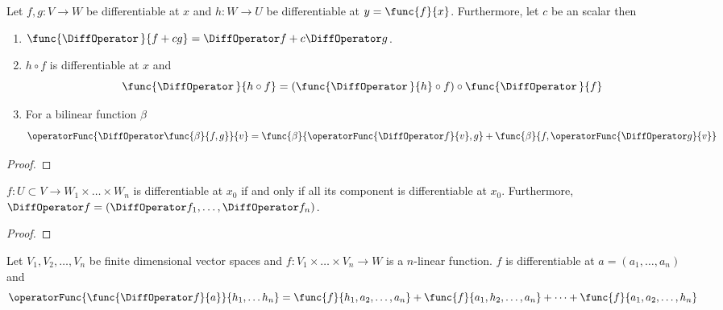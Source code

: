 \begin{proposition}
    Let \(f,g : V \to W\) be differentiable at \(x\) and \(h : W \to U\) be differentiable at \(y = \func{f}{x}\). Furthermore, let \(c\) be an scalar then
    \begin{enumerate}
        \item \(\func{\DiffOperator \,}{ f + cg} = \DiffOperator f + c \DiffOperator g\).
        \item  \(h \circ f\) is differentiable at \(x\) and
              \begin{equation*}
                  \func{\DiffOperator \,}{ h \circ f} =  \left( \func{\DiffOperator \,}{h}\circ f \right) \circ \func{\DiffOperator \, }{ f}
              \end{equation*}
        \item For a bilinear function \(\beta\)
              \begin{equation*}
                  \operatorFunc{\DiffOperator \func{\beta}{f,g}}{v} = \func{\beta}{\operatorFunc{\DiffOperator f}{v},g} + \func{\beta}{f, \operatorFunc{\DiffOperator g}{v}}
              \end{equation*}
    \end{enumerate}
\end{proposition}
\begin{proof}

\end{proof}

\begin{proposition}
    \(f : U \subset V \to W_1 \times \dots \times W_n\) is differentiable at \(x_0\) if and only if all its component is differentiable at \(x_0\). Furthermore, \(\DiffOperator f = (\DiffOperator f_1, \dots , \DiffOperator f_n)\).
\end{proposition}

\begin{proof}

\end{proof}

\begin{theorem}
    Let \(V_1, V_2, \dots , V_n\) be finite dimensional vector spaces and \(f: V_1 \times \dots \times V_n \to W\) is a \(n\)-linear function. \(f\) is differentiable at \(a = (a_1, \dots , a_n)\) and
    \begin{equation*}
        \operatorFunc{\func{\DiffOperator f}{a}}{h_1, \dots h_n} = \func{f}{h_1, a_2, \dots, a_n} + \func{f}{a_1, h_2, \dots, a_n} + \dots + \func{f}{a_1, a_2, \dots, h_n}
    \end{equation*}
\end{theorem}

